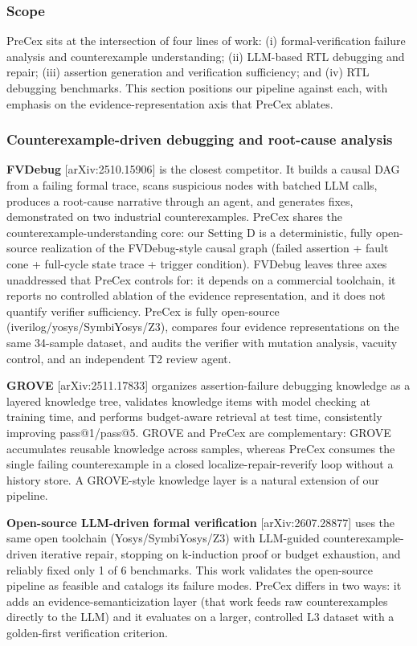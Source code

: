 \documentclass[
  11pt,
]{article}
\begin{document}
\subsubsection{Scope}\label{scope}

PreCex sits at the intersection of four lines of work: (i) formal-verification failure analysis and counterexample understanding; (ii) LLM-based RTL debugging and repair; (iii) assertion generation and verification sufficiency; and (iv) RTL debugging benchmarks. This section positions our pipeline against each, with emphasis on the evidence-representation axis that PreCex ablates.

\subsubsection{Counterexample-driven debugging and root-cause analysis}\label{counterexample-driven-debugging-and-root-cause-analysis}

\textbf{FVDebug} {[}arXiv:2510.15906{]} is the closest competitor. It builds a causal DAG from a failing formal trace, scans suspicious nodes with batched LLM calls, produces a root-cause narrative through an agent, and generates fixes, demonstrated on two industrial counterexamples. PreCex shares the counterexample-understanding core: our Setting D is a deterministic, fully open-source realization of the FVDebug-style causal graph (failed assertion + fault cone + full-cycle state trace + trigger condition). FVDebug leaves three axes unaddressed that PreCex controls for: it depends on a commercial toolchain, it reports no controlled ablation of the evidence representation, and it does not quantify verifier sufficiency. PreCex is fully open-source (iverilog/yosys/SymbiYosys/Z3), compares four evidence representations on the same 34-sample dataset, and audits the verifier with mutation analysis, vacuity control, and an independent T2 review agent.

\textbf{GROVE} {[}arXiv:2511.17833{]} organizes assertion-failure debugging knowledge as a layered knowledge tree, validates knowledge items with model checking at training time, and performs budget-aware retrieval at test time, consistently improving pass@1/pass@5. GROVE and PreCex are complementary: GROVE accumulates reusable knowledge across samples, whereas PreCex consumes the single failing counterexample in a closed localize-repair-reverify loop without a history store. A GROVE-style knowledge layer is a natural extension of our pipeline.

\textbf{Open-source LLM-driven formal verification} {[}arXiv:2607.28877{]} uses the same open toolchain (Yosys/SymbiYosys/Z3) with LLM-guided counterexample-driven iterative repair, stopping on k-induction proof or budget exhaustion, and reliably fixed only 1 of 6 benchmarks. This work validates the open-source pipeline as feasible and catalogs its failure modes. PreCex differs in two ways: it adds an evidence-semanticization layer (that work feeds raw counterexamples directly to the LLM) and it evaluates on a larger, controlled L3 dataset with a golden-first verification criterion.
\end{document}
